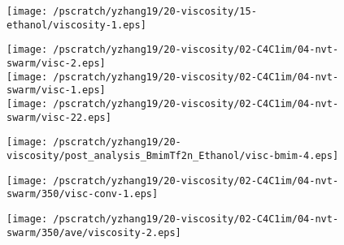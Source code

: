 \documentclass[12pt]{article}
\begin{document}
\newpage
\clearpage
\begin{figure}
\begin{center}
\texttt{[image: /pscratch/yzhang19/20-viscosity/15-ethanol/viscosity-1.eps]}
\caption{}
\label{fig:ethanol-boxsize}
\end{center}
\end{figure}



\newpage
\clearpage
\begin{figure}
\begin{center}
\texttt{[image: /pscratch/yzhang19/20-viscosity/02-C4C1im/04-nvt-swarm/visc-2.eps]}
\\
\texttt{[image: /pscratch/yzhang19/20-viscosity/02-C4C1im/04-nvt-swarm/visc-1.eps]}
\\
\texttt{[image: /pscratch/yzhang19/20-viscosity/02-C4C1im/04-nvt-swarm/visc-22.eps]}
\caption{}
\label{fig:bmim-ave}
\end{center}
\end{figure}


\newpage
\clearpage
\begin{figure}
\begin{center}
\texttt{[image: /pscratch/yzhang19/20-viscosity/post\_analysis\_BmimTf2n\_Ethanol/visc-bmim-4.eps]}
\caption{}
\label{fig:bmim-visc}
\end{center}
\end{figure}


\newpage
\clearpage
\begin{figure}
\begin{center}
\texttt{[image: /pscratch/yzhang19/20-viscosity/02-C4C1im/04-nvt-swarm/350/visc-conv-1.eps]}
\caption{}
\label{fig:bmim-num}
\end{center}
\end{figure}

\newpage
\clearpage
\begin{figure}
\begin{center}
\texttt{[image: /pscratch/yzhang19/20-viscosity/02-C4C1im/04-nvt-swarm/350/ave/viscosity-2.eps]}
\caption{}
\label{fig:t2weight}
\end{center}
\end{figure}


\end{document}

